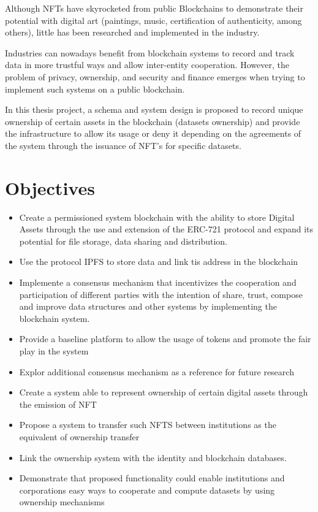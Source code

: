 Although NFTs have skyrocketed from public Blockchains to demonstrate their potential with digital art (paintings, music, certification of authenticity, among others), little has been researched and implemented in the industry.

Industries can nowadays benefit from blockchain systems to record and track data in more trustful ways and allow inter-entity cooperation. However, the problem of privacy, ownership, and security and finance emerges when trying to implement such systems on a public blockchain. 

In this thesis project, a schema and system design is proposed to record unique ownership of certain assets in the blockchain (datasets ownership) and provide the infrastructure to allow its usage or deny it depending on the agreements of the system through the issuance of NFT's for specific datasets.

\section{Objectives}
\begin{itemize}
    \item Create a permissioned system blockchain with the ability to store Digital Assets through the use and extension of the ERC-721 protocol and expand its potential for file storage, data sharing and distribution.
    \item Use the protocol IPFS to store data and link tis address in the blockchain
    \item Implemente a consensus mechanism that incentivizes the cooperation and participation of different parties with the intention of share, trust, compose and improve data structures and other systems by implementing the blockchain system.
    \item Provide a baseline platform to allow the usage of tokens and promote the fair play in the system
    \item Explor additional consensus mechanism as a reference for future research
    \item Create a system able to represent ownership of certain digital assets through the emission of \ac{NFT}
\item Propose a system to transfer such NFTS between institutions as the equivalent of ownership transfer
\item Link the ownership system with the identity and blockchain databases.
\item Demonstrate that proposed functionality could enable institutions and corporations easy ways to cooperate and compute datasets by using ownership mechanisms

\end{itemize}


